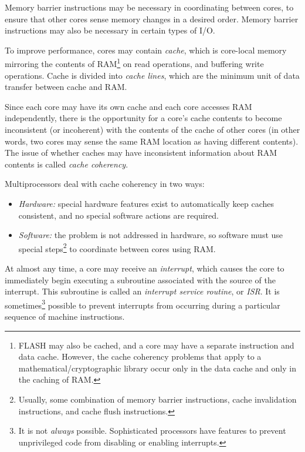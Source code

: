 Memory barrier instructions may be necessary in coordinating 
between cores, to ensure that other cores sense memory 
changes in a desired order.  Memory barrier instructions may 
also be necessary in certain types of I/O.  

To improve performance, cores may contain 
\emph{cache}, which is core-local memory 
mirroring the contents of RAM\footnote{FLASH may also be 
cached, and a core may have a separate instruction and data 
cache.  However, the cache coherency problems that apply to 
a mathematical/cryptographic library occur only in the data 
cache and only in the caching of RAM.} on read operations, 
and buffering write operations.  Cache is divided into 
\emph{cache lines}, which are the minimum 
unit of data transfer between cache and RAM.  

Since each core may have its own cache and each core 
accesses RAM independently, there is the opportunity for a 
core's cache contents to become inconsistent (or incoherent) 
with the contents of the cache of other cores (in other 
words, two cores may sense the same RAM location as having 
different contents).  The issue of whether caches may have 
inconsistent information about RAM contents is called 
\emph{cache coherency}.  

Multiprocessors deal with cache coherency in two ways:

\begin{itemize}
\item \emph{Hardware:} special hardware features exist to
      automatically keep caches consistent, and no
      special software actions are required.  
\item \emph{Software:} the problem is not addressed in
      hardware, so software must use special
      steps\footnote{Usually, some combination of 
      memory barrier instructions, cache invalidation
      instructions, and cache flush instructions.} to
      coordinate between cores using RAM.  
\end{itemize}

At almost any time, a core may receive an 
\emph{interrupt}, which causes the core to 
immediately begin executing a subroutine associated with the 
source of the interrupt.  This subroutine is called an 
\emph{interrupt 
service routine}, or \emph{ISR}\@.  It is 
sometimes\footnote{It is not \emph{always} possible.  
Sophisticated processors have features to prevent 
unprivileged code from disabling or enabling interrupts.} 
possible to prevent interrupts from occurring during a 
particular sequence of machine instructions.  


